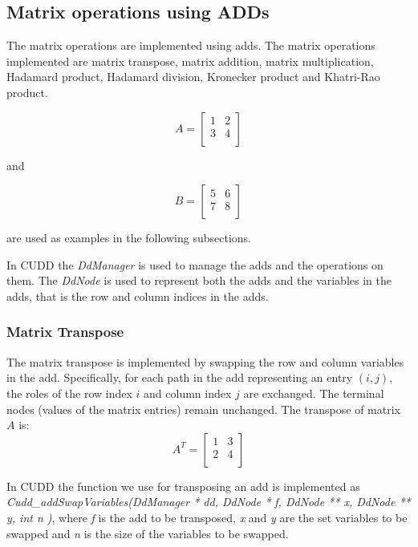 \subsection{Matrix operations using ADDs}\label{subsec:matrix-operations-using-adds}
The matrix operations are implemented using \glspl{add}.
The matrix operations implemented are matrix transpose, matrix addition, matrix multiplication, Hadamard product, Hadamard division, Kronecker product and Khatri-Rao product.

\[
    A = \begin{bmatrix}
            1 & 2 \\
            3 & 4 \\
    \end{bmatrix}
\]

and

\[
    B = \begin{bmatrix}
            5 & 6 \\
            7 & 8 \\
    \end{bmatrix}
\]

are used as examples in the following subsections.

In CUDD the \textit{DdManager} is used to manage the \glspl{add} and the operations on them.
The \textit{DdNode} is used to represent both the \glspl{add} and the variables in the \glspl{add}, that is the row and column indices in the \glspl{add}.

\subsubsection{Matrix Transpose}
The matrix transpose is implemented by swapping the row and column variables in the \gls{add}. Specifically, for each path in the \gls{add} representing an entry $(i, j)$, the roles of the row index 
$i$ and column index $j$ are exchanged. The terminal nodes (values of the matrix entries) remain unchanged.
The transpose of matrix $A$ is:
\[
    A^T = \begin{bmatrix}
              1 & 3 \\
              2 & 4 \\
    \end{bmatrix}
\]

In CUDD the function we use for transposing an \gls{add} is implemented as \textit{Cudd\_addSwapVariables(DdManager * dd, DdNode * f, DdNode ** x, DdNode ** y, int  n )}, where \textit{f} is the \gls{add} to be transposed, \textit{x} and \textit{y} are the set variables to be swapped and \textit{n} is the size of the variables to be swapped.

